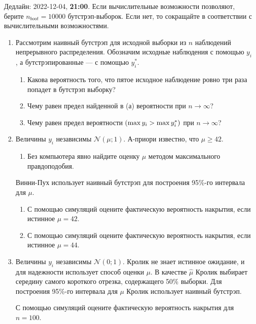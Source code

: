 \documentclass[12pt]{article}
\let\P\relax
\DeclareMathOperator{\P}{\mathbb{P}}
\newcommand \cN{\mathcal{N}}
\begin{document}
Дедлайн: 2022-12-04, \textbf{21:00}. Если вычислительные возможности позволяют, берите $n_{boot}=10000$ бутстрэп-выборок. 
Если нет, то сокращайте в соответствии с вычислительными возможностями. 

\begin{enumerate}

\item Рассмотрим наивный бутстрэп для исходной выборки из $n$ наблюдений непрерывного распределения. 
Обозначим исходные наблюдения с помощью $y_i$, а бутстрэпированные — с помощью $y_i^*$.

\begin{enumerate}
    \item Какова вероятность того, что пятое исходное наблюдение ровно три раза попадет в бутстрэп выборку?        
    \item Чему равен предел найденной в (а) вероятности при $n\to \infty$?
    \item Чему равен предел вероятности $\P(\max y_i > \max y_i^*)$ при $n\to \infty$?
\end{enumerate}




\item Величины $y_i$ независимы $\cN(\mu;1)$. А-приори известно, что $\mu \geq 42$.
\begin{enumerate}
    \item Без компьютера явно найдите оценку $\mu$  методом максимального правдоподобия.
\end{enumerate}
Винни-Пух использует наивный бутстрэп для построения 95\%-го  интервала для $\mu$. 
\begin{enumerate}[resume]
    \item С помощью симуляций оцените фактическую вероятность накрытия, если истинное $\mu = 42$.
    \item С помощью симуляций оцените фактическую вероятность накрытия, если истинное $\mu = 44$.
\end{enumerate}


\item Величины $y_i$ независимы $\cN(0;1)$. 
Кролик не знает истинное ожидание, и для надежности использует  способ оценки $\mu$. 
В качестве $\hat \mu$ Кролик выбирает середину самого короткого отрезка, содержащего 50\% выборки. 
Для построения 95\%-го интервала для $\mu$ Кролик использует наивный бутстрэп. 

С помощью симуляций оцените фактическую вероятность накрытия для $n=100$.


\end{enumerate}
\end{document}
